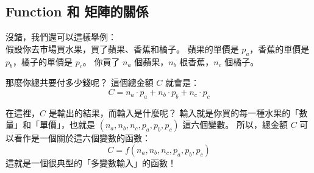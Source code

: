 \subsection{Function 和 矩陣的關係}


\smallerVerticalGap \vspace{-2cm}


\begin{textLeft} \begin{teacherSaid}
沒錯，我們還可以這樣舉例： \\

假設你去市場買水果，買了蘋果、香蕉和橘子。
蘋果的單價是 $p_a$，香蕉的單價是 $p_b$，橘子的單價是 $p_c$。
你買了 $n_a$ 個蘋果，$n_b$ 根香蕉，$n_c$ 個橘子。

那麼你總共要付多少錢呢？
這個總金額 $C$ 就會是：
$$ C = n_a \cdot p_a + n_b \cdot p_b + n_c \cdot p_c $$

在這裡，$C$ 是輸出的結果，而輸入是什麼呢？
輸入就是你買的每一種水果的「數量」和「單價」，也就是 $(n_a, n_b, n_c, p_a, p_b, p_c)$ 這六個變數。
所以，總金額 $C$ 可以看作是一個關於這六個變數的函數：
$$ C = f(n_a, n_b, n_c, p_a, p_b, p_c) $$
這就是一個很典型的「多變數輸入」的函數！



\end{teacherSaid} \end{textLeft}


